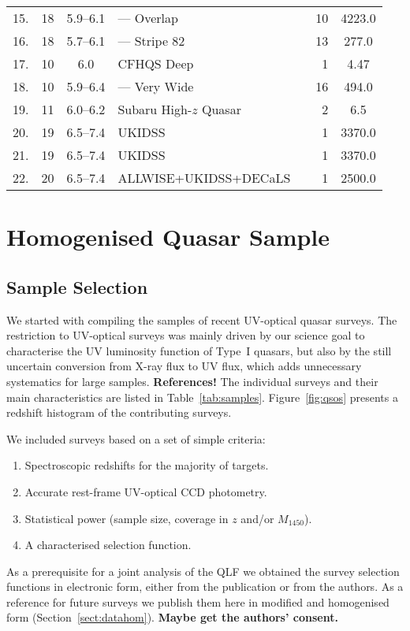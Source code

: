 \documentclass[fleqn,usenatbib]{mnras}
\begin{document}
\begin{table*}
\begin{tabular}{crcllrS}
    15. & 18 & 5.9--6.1 & --- Overlap & \citet{2016ApJ...833..222J} & 10 & 4223.0 \\
    16. & 18 & 5.7--6.1 & --- Stripe 82 & \citet{2016ApJ...833..222J} & 13 & 277.0 \\
    17. & 10 & 6.0 & CFHQS Deep & \citet{2010AJ....139..906W} & 1 & 4.47 \\
    18. & 10 & 5.9--6.4 & --- Very Wide & \citet{2010AJ....139..906W} & 16 & 494.0 \\
    19. & 11 & 6.0--6.2 & Subaru High-$z$ Quasar & \citet{2015ApJ...798...28K} & 2 & 6.5 \\
    20. & 19 & 6.5--7.4 & UKIDSS & \citet{2011Natur.474..616M} & 1 & 3370.0 \\
    21. & 19 & 6.5--7.4 & UKIDSS & \citet{2007MNRAS.376L..76V} & 1 & 3370.0 \\
    22. & 20 & 6.5--7.4 & ALLWISE+UKIDSS+DECaLS & \citet{2018Natur.553..473B} & 1 & 2500.0 \\
    \hline
  \end{tabular}
\end{table*}

\section{Homogenised Quasar Sample}
\label{sec:sample}

\subsection{Sample Selection}

We started with compiling the samples of recent UV-optical quasar
surveys. The restriction to UV-optical surveys was mainly driven by
our science goal to characterise the UV luminosity function of Type~I
quasars, but also by the still uncertain conversion from X-ray flux to
UV flux, which adds unnecessary systematics for large
samples. \textbf{References!} The individual surveys and their main
characteristics are listed in
Table~\ref{tab:samples}. Figure~\ref{fig:qsos} presents a redshift
histogram of the contributing surveys.

We included surveys based on a set of simple criteria:
\begin{enumerate}
\item Spectroscopic redshifts for the majority of targets.
\item Accurate rest-frame UV-optical CCD photometry.
\item Statistical power (sample size, coverage in $z$ and/or $M_{1450}$).
\item A characterised selection function.
\end{enumerate}
As a prerequisite for a joint analysis of the QLF we obtained the
survey selection functions in electronic form, either from the
publication or from the authors. As a reference for future surveys we
publish them here in modified and homogenised form
(Section~\ref{sect:datahom}). \textbf{Maybe get the authors' consent.}
\end{document}
